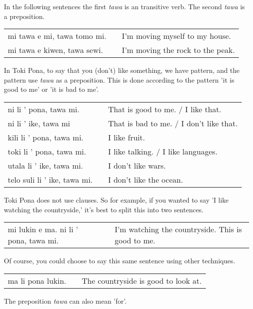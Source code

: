 In the following sentences the first \textit{tawa} is an transitive verb.
The second \textit{tawa} is a preposition.

\begin{supertabular}{p{5,5cm}|ll}
mi tawa e mi, tawa tomo mi. && I'm moving myself to my house. \\
mi tawa e kiwen, tawa sewi. && I'm moving the rock to the peak. \\
\end{supertabular} 

%
In Toki Pona, to say that you (don't) like something, we have pattern, and the pattern use \textit{tawa} as a preposition. 
This is done according to the pattern 'it is good to me' or 'it is bad to me'. 

\begin{supertabular}{p{5,5cm}|ll}
ni li ' pona, tawa mi. && That is good to me. / I like that. \\
ni li ' ike, tawa mi && That is bad to me. / I don't like that. \\
kili li ' pona, tawa mi. && I like fruit. \\
toki li ' pona, tawa mi. && I like talking. / I like languages. \\
utala li ' ike, tawa mi. && I don't like wars. \\
telo suli li ' ike, tawa mi. && I don't like the ocean. \\
\end{supertabular} 

%
Toki Pona does not use clauses. 
So for example, if you wanted to say 'I like watching the countryside,' it's best to split this into two sentences.

\begin{supertabular}{p{5,5cm}|ll}
mi lukin e ma. ni li ' pona, tawa mi. && I'm watching the countryside. This is good to me.\\
\end{supertabular} 

Of course, you could choose to say this same sentence using other techniques. 

\begin{supertabular}{p{5,5cm}|ll}
ma li pona lukin. && The countryside is good to look at. \\
\end{supertabular} 

%
The preposition \textit{tawa} can also mean 'for'.
 
